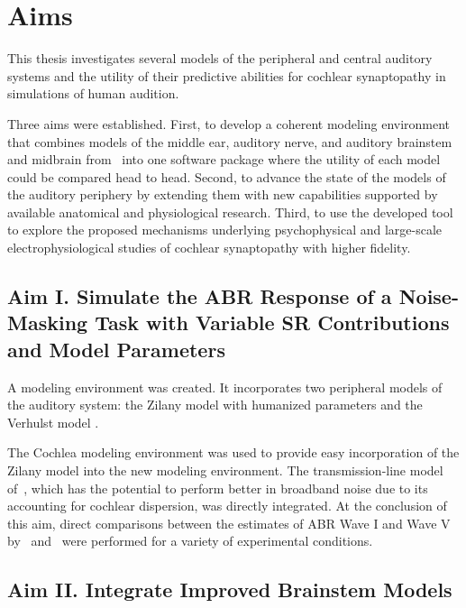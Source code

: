 \chapter{Aims}
\label{chapter:Aims}
\thispagestyle{myheadings}
This thesis investigates several models of the peripheral and central auditory systems and the utility of their predictive abilities for cochlear synaptopathy in simulations of human audition. 

Three aims were established.  First, to develop a coherent modeling environment that combines models of the middle ear, auditory nerve, and auditory brainstem and midbrain from~\cite{Zilany2014Updated,Verhulst2015Functional,Nelson2004Phenomenological,Carney2015Speech} into one software package where the utility of each model could be compared head to head.  Second, to advance the state of the models of the auditory periphery by extending them with new capabilities supported by available anatomical and physiological research.  Third, to use the developed tool to explore the proposed mechanisms underlying psychophysical and large-scale electrophysiological studies of cochlear synaptopathy with higher fidelity.


\section{Aim I. Simulate the ABR Response of a Noise-Masking Task with Variable SR Contributions and Model Parameters}
A modeling environment was created.  It incorporates two peripheral models of the auditory system: the Zilany model with humanized parameters \citep{Zilany2014Updated} and the Verhulst model \citep{Verhulst2015Functional}.  

The Cochlea modeling environment \citep{Rudnicki2014Cochlea} was used to provide easy incorporation of the Zilany model into the new modeling environment. The transmission-line model of~\cite{Verhulst2015Functional}, which has the potential to perform better in broadband noise due to its  accounting for cochlear dispersion, was directly integrated.
At the conclusion of this aim, direct comparisons between the estimates of ABR Wave I and Wave V by~\cite{Zilany2014Updated} and~\cite{Verhulst2015Functional} were performed for a variety of experimental conditions.

\section{Aim II. Integrate Improved Brainstem Models}  

